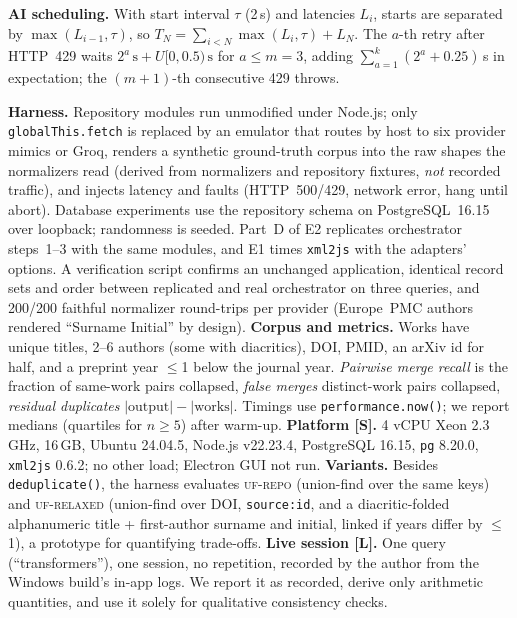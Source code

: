 \documentclass[conference]{IEEEtran}
\newcommand{\code}[1]{\texttt{\small #1}}
\begin{document}
\textbf{AI scheduling.} With start interval $\tau$ (2\,s) and latencies $L_i$, starts are separated by $\max(L_{i-1},\tau)$, so $T_N=\sum_{i<N}\max(L_i,\tau)+L_N$. The $a$-th retry after HTTP~429 waits $2^{a}\,\text{s}+U[0,0.5)\,\text{s}$ for $a\le m=3$, adding $\sum_{a=1}^{k}(2^a+0.25)$\,s in expectation; the $(m{+}1)$-th consecutive 429 throws.

\textbf{Harness.} Repository modules run unmodified under Node.js; only \code{globalThis.fetch} is replaced by an emulator that routes by host to six provider mimics or Groq, renders a synthetic ground-truth corpus into the raw shapes the normalizers read (derived from normalizers and repository fixtures, \emph{not} recorded traffic), and injects latency and faults (HTTP~500/429, network error, hang until abort). Database experiments use the repository schema on PostgreSQL~16.15 over loopback; randomness is seeded. Part~D of E2 replicates orchestrator steps~1--3 with the same modules, and E1 times \code{xml2js} with the adapters' options. A verification script confirms an unchanged application, identical record sets and order between replicated and real orchestrator on three queries, and 200/200 faithful normalizer round-trips per provider (Europe~PMC authors rendered ``Surname Initial'' by design).
\textbf{Corpus and metrics.} Works have unique titles, 2--6 authors (some with diacritics), DOI, PMID, an arXiv id for half, and a preprint year $\le$1 below the journal year. \emph{Pairwise merge recall} is the fraction of same-work pairs collapsed, \emph{false merges} distinct-work pairs collapsed, \emph{residual duplicates} $|\text{output}|-|\text{works}|$. Timings use \code{performance.now()}; we report medians (quartiles for $n\ge5$) after warm-up.
\textbf{Platform [S].} 4 vCPU Xeon 2.3\,GHz, 16\,GB, Ubuntu 24.04.5, Node.js v22.23.4, PostgreSQL 16.15, \code{pg} 8.20.0, \code{xml2js} 0.6.2; no other load; Electron GUI not run.
\textbf{Variants.} Besides \code{deduplicate()}, the harness evaluates \textsc{uf-repo} (union-find over the same keys) and \textsc{uf-relaxed} (union-find over DOI, \code{source:id}, and a diacritic-folded alphanumeric title + first-author surname and initial, linked if years differ by $\le$1), a prototype for quantifying trade-offs.
\textbf{Live session [L].} One query (``transformers''), one session, no repetition, recorded by the author from the Windows build's in-app logs. We report it as recorded, derive only arithmetic quantities, and use it solely for qualitative consistency checks.
\end{document}

